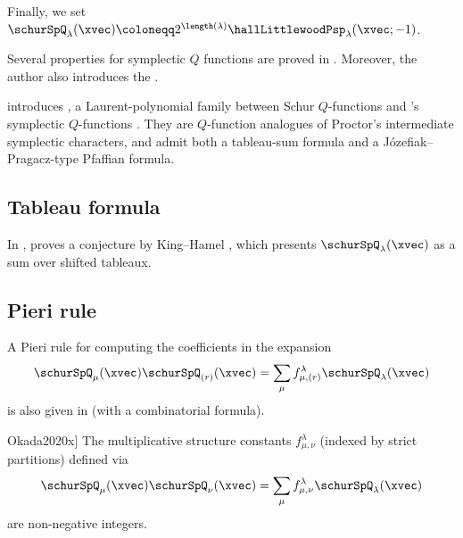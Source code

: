 Finally, we set
$\schurSpQ_{\lambda}(\xvec) \coloneqq 2^{\length(\lambda)}\hallLittlewoodPsp_\lambda(\xvec;-1)$.


Several properties for symplectic $Q$ functions are proved in \cite{Okada2020x}.
Moreover, the author also introduces the .

 introduces , a Laurent-polynomial family between Schur $Q$-functions and
's symplectic $Q$-functions \cite{Yanagida2022x}.  They
are $Q$-function analogues of Proctor's intermediate symplectic characters,
and admit both a tableau-sum formula and a J{\'o}zefiak--Pragacz-type Pfaffian
formula.


\subsection[schurSymplecticQTab]{Tableau formula}

In \cite{Okada2020x},  proves a conjecture by King--Hamel \cite[Conj. 3.1]{KingHamel2007},
which presents $\schurSpQ_{\lambda}(\xvec)$ as a sum over shifted tableaux.


\subsection[schurSymplecticQPieri]{Pieri rule}

A Pieri rule for computing the coefficients in the expansion
\[
\schurSpQ_{\mu}(\xvec) \schurSpQ_{(r)}(\xvec) = 
\sum_{\mu}  f^{\lambda}_{\mu,(r)} \schurSpQ_{\lambda}(\xvec)
\]
is also given in \cite{Okada2020x} (with a combinatorial formula).

\begin{conjecture}[See \cite[Conj. 6.1]{Okada2020x}]
The multiplicative structure constants $f^{\lambda}_{\mu,\nu}$
(indexed by strict partitions) defined via 
\[
\schurSpQ_{\mu}(\xvec) \schurSpQ_{\nu}(\xvec) = 
\sum_{\mu}  f^{\lambda}_{\mu,\nu} \schurSpQ_{\lambda}(\xvec)
\]
are non-negative integers.

\end{conjecture}


